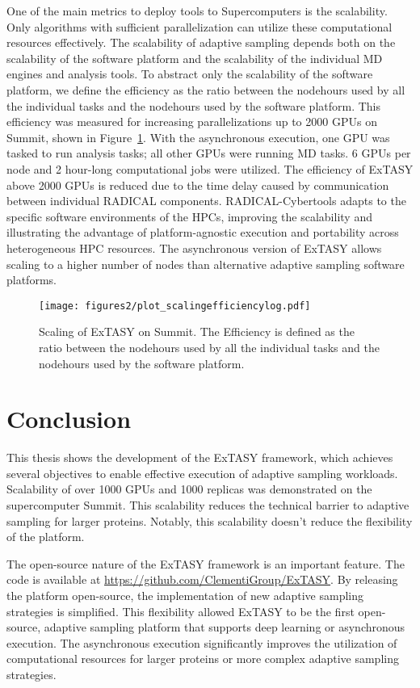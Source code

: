 {One of the main metrics to deploy tools to Supercomputers is the scalability. Only algorithms with sufficient parallelization can utilize these computational resources effectively. The scalability of adaptive sampling depends both on the scalability of the software platform and the scalability of the individual MD engines and analysis tools. To abstract only the scalability of the software platform, we define the efficiency as the ratio between the nodehours used by all the individual tasks and the nodehours used by the software platform. 
This efficiency was measured for increasing parallelizations up to 2000 GPUs on Summit, shown in Figure~\ref{fig:scaling}. With the asynchronous execution, one GPU was tasked to run analysis tasks; all other GPUs were running MD tasks. 6 GPUs per node and 2 hour-long computational jobs were utilized. The efficiency of ExTASY above 2000 GPUs is reduced due to the time delay caused by communication between individual RADICAL components. RADICAL-Cybertools adapts to the specific software environments of the HPCs\cite{turilli2019ac}, improving the scalability and illustrating the advantage of platform-agnostic execution and portability across
heterogeneous HPC resources. The asynchronous version of ExTASY allows scaling to a higher number of nodes than alternative adaptive sampling software platforms.

\begin{figure}[H]
  \centering
  \texttt{[image: figures2/plot\_scalingefficiencylog.pdf]}
  \caption{Scaling of ExTASY on Summit. The Efficiency is defined as the ratio between the nodehours used by all the individual tasks and the nodehours used by the software platform. }
  \label{fig:scaling}
\end{figure}



\section{\label{sec:conclusion}Conclusion}
This thesis shows the development of the ExTASY framework, which achieves several objectives to enable effective execution of adaptive sampling workloads. Scalability of over 1000 GPUs and 1000 replicas was demonstrated on the supercomputer Summit. This scalability reduces the technical barrier to adaptive sampling for larger proteins. Notably, this scalability doesn't reduce the flexibility of the platform.

The open-source nature of the ExTASY framework is an important feature. The code is available at \href{https://github.com/ClementiGroup/ExTASY}{https://github.com/ClementiGroup/ExTASY}. By releasing the platform open-source, the implementation of new adaptive sampling strategies is simplified. This flexibility allowed ExTASY to be the first open-source, adaptive sampling platform that supports deep learning or asynchronous execution. The asynchronous execution significantly improves the utilization of computational resources for larger proteins or more complex adaptive sampling strategies.

}
